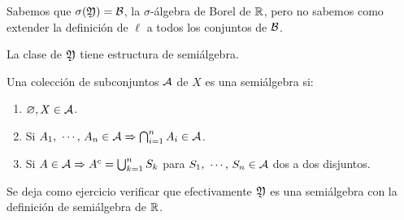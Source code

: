 Sabemos que $\sigma(\mathfrak{Y}) = \mathcal{B}$, la $\sigma$-álgebra de Borel de $\mathbb{R}$, pero no sabemos como extender la definición de $\ell$ a todos los conjuntos de $\mathcal{B}$.

La clase de $\mathfrak{Y}$ tiene estructura de semiálgebra.

\begin{definition}[Semiálgebra]
    Una colección de subconjuntos $\mathcal{A}$ de $X$ es una semiálgebra si: \begin{enumerate}
        \item $\varnothing, X \in \mathcal{A}$.
        \item Si $A_1 \text{, } \cdots \text{, } A_n \in \mathcal{A} \Rightarrow \bigcap_{i = 1}^n A_i \in \mathcal{A}$.
        \item Si $A \in \mathcal{A} \Rightarrow A^c = \bigcup_{k = 1}^n S_k$ para $S_1\text{, } \cdots \text{, } S_n \in \mathcal{A}$ dos a dos disjuntos.
    \end{enumerate}
\end{definition}

Se deja como ejercicio verificar que efectivamente $\mathfrak{Y}$ es una semiálgebra con la definición de semiálgebra de $\mathbb{R}$.

